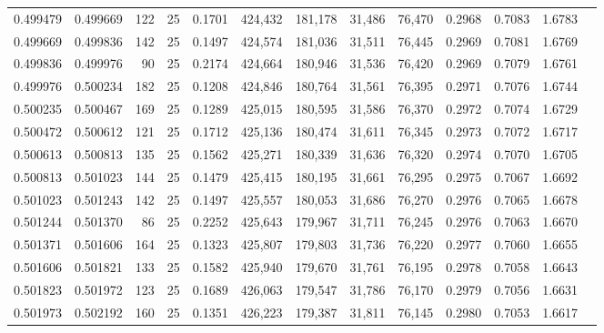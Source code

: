 \begin{tabular}{rrrrrrrrrrrrr}
0.499479 & 0.499669 &   122 &  25 &                                     0.1701 & 424,432 & 181,178 &  31,486 &  76,470 & 0.2968 & 0.7083 & 1.6783 \\
0.499669 & 0.499836 &   142 &  25 &                                     0.1497 & 424,574 & 181,036 &  31,511 &  76,445 & 0.2969 & 0.7081 & 1.6769 \\
0.499836 & 0.499976 &    90 &  25 &                                     0.2174 & 424,664 & 180,946 &  31,536 &  76,420 & 0.2969 & 0.7079 & 1.6761 \\
0.499976 & 0.500234 &   182 &  25 &                                     0.1208 & 424,846 & 180,764 &  31,561 &  76,395 & 0.2971 & 0.7076 & 1.6744 \\
0.500235 & 0.500467 &   169 &  25 &                                     0.1289 & 425,015 & 180,595 &  31,586 &  76,370 & 0.2972 & 0.7074 & 1.6729 \\
0.500472 & 0.500612 &   121 &  25 &                                     0.1712 & 425,136 & 180,474 &  31,611 &  76,345 & 0.2973 & 0.7072 & 1.6717 \\
0.500613 & 0.500813 &   135 &  25 &                                     0.1562 & 425,271 & 180,339 &  31,636 &  76,320 & 0.2974 & 0.7070 & 1.6705 \\
0.500813 & 0.501023 &   144 &  25 &                                     0.1479 & 425,415 & 180,195 &  31,661 &  76,295 & 0.2975 & 0.7067 & 1.6692 \\
0.501023 & 0.501243 &   142 &  25 &                                     0.1497 & 425,557 & 180,053 &  31,686 &  76,270 & 0.2976 & 0.7065 & 1.6678 \\
0.501244 & 0.501370 &    86 &  25 &                                     0.2252 & 425,643 & 179,967 &  31,711 &  76,245 & 0.2976 & 0.7063 & 1.6670 \\
0.501371 & 0.501606 &   164 &  25 &                                     0.1323 & 425,807 & 179,803 &  31,736 &  76,220 & 0.2977 & 0.7060 & 1.6655 \\
0.501606 & 0.501821 &   133 &  25 &                                     0.1582 & 425,940 & 179,670 &  31,761 &  76,195 & 0.2978 & 0.7058 & 1.6643 \\
0.501823 & 0.501972 &   123 &  25 &                                     0.1689 & 426,063 & 179,547 &  31,786 &  76,170 & 0.2979 & 0.7056 & 1.6631 \\
0.501973 & 0.502192 &   160 &  25 &                                     0.1351 & 426,223 & 179,387 &  31,811 &  76,145 & 0.2980 & 0.7053 & 1.6617 \\

\end{tabular}
